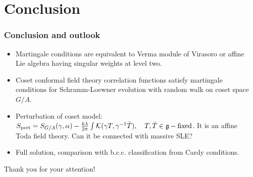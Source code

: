 \documentclass[pdftex]{beamer}
\newcommand{\gf}{\mathfrak{g}}
\newcommand{\af}{\mathfrak{a}}
\theoremstyle{definition} \newtheorem{Def}{Definition}
\begin{document}
\section{Conclusion}
\label{sec:conclusion}


\begin{frame}
  \frametitle{Conclusion and outlook}
  \begin{itemize}
  \item Martingale conditions are equivalent to Verma module of Virasoro or affine Lie algebra having singular weights at level two.
  \item Coset conformal field theory correlation functions satisfy martingale conditions for
    Schramm-Loewner evolution with random walk on coset space $G/A$.
  \item Perturbation of coset model: $
    S_{\text{pert}}=S_{G/A}(\gamma,\alpha)-\frac{k\lambda}{2\pi}\int {\cal K} (\gamma T, \gamma^{-1}
    \bar T),\quad  T,\bar T\in \gf - \mathrm{fixed}$. It is an affine Toda field theory. Can it be
    connected with massive SLE?
  \item Full solution, comparison with b.c.c. classification from Cardy conditions.
  \end{itemize}
\end{frame}

\begin{frame}[c,plain]
  \begin{center}
  \Large{Thank you for your attention!}
  \end{center}
\end{frame}

{} 

\end{document}
